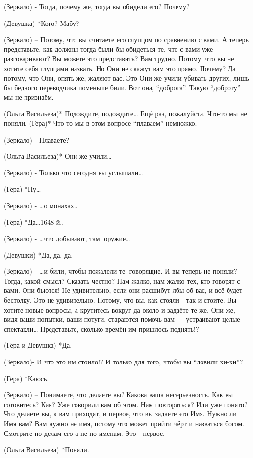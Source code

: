 (Зеркало) - Тогда, почему же, тогда вы обидели его? Почему?

(Девушка) *Кого? Мабу?

(Зеркало) – Потому, что вы считаете его глупцом по сравнению с вами. А теперь представьте, как должны тогда были-бы обидеться те, что с вами уже разговаривают? Вы можете это представить? Вам трудно. Потому, что вы не хотите себя глупцами назвать. Но Они не скажут вам это прямо. Почему? Да потому, что Они, опять же, жалеют вас. Это Они же  учили убивать других, лишь бы бедного переводчика поменьше били. Вот она, “доброта”. Такую “доброту” мы не признаём.

(Ольга Васильева)* Подождите, подождите… Ещё раз, пожалуйста. Что-то мы не поняли.
(Гера)* Что-то мы в этом вопросе  “плаваем” немножко.

(Зеркало) -  Плаваете?

(Ольга Васильева)* Они же учили…

(Зеркало) - Только что сегодня вы услышали… 

(Гера) *Ну… 

(Зеркало) - …о монахах..

(Гера) *Да…1648-й.. 

(Зеркало) - …что добывают, там, оружие…

(Девушки) *Да, да, да.

(Зеркало)  - …и били, чтобы пожалели те, говорящие. И вы теперь не поняли? Тогда, какой смысл? Сказать честно? Нам жалко, нам жалко тех, кто говорят с вами. Они бьются! Не удивительно, если они расшибут лбы об вас, и всё будет бестолку. Это не удивительно. Потому, что вы, как стояли - так и стоите. Вы хотите новые вопросы, а крутитесь вокруг да около и задаёте те же. Они же, видя ваши попытки, ваши потуги, стараются помочь вам — устраивают целые спектакли… Представьте, сколько времён им пришлось поднять!?

(Гера и Девушка) *Да.

(Зеркало)-  И что это им стоило!? И только для того, чтобы вы “ловили хи-хи”? 

(Гера) *Каюсь.

(Зеркало) – Понимаете, что делаете вы? Какова ваша несерьезность. Как вы готовитесь? Как? Уже говорили вам об этом. Нам повторяться? Или уже понято? Что делаете вы, к вам приходят, и первое, что вы задаете это Имя. Нужно ли Имя вам? Вам нужно не имя, потому что может прийти чёрт и назваться богом. Смотрите по делам его а не по именам. Это - первое. 

(Ольга Васильева) *Поняли.

